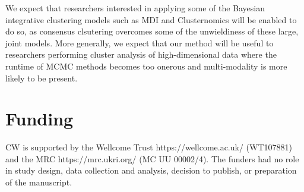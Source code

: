 \documentclass{bioinfo}
\begin{document}
We expect that researchers interested in applying some of the Bayesian integrative clustering models such as MDI and Clusternomics \citep{gabasova2017clusternomics} will be enabled to do so, as consensus clsutering overcomes some of the unwieldiness of these large, joint models. More generally, we expect that our method will be useful to researchers performing cluster analysis of high-dimensional data where the runtime of MCMC methods becomes too onerous and multi-modality is more likely to be present.






%
%






%
%
%
%
%
%
%

\section*{Funding}
CW is supported by the Wellcome Trust https://wellcome.ac.uk/ (WT107881) and the MRC https://mrc.ukri.org/ (MC UU 00002/4). The funders had no role in study design, data collection and analysis, decision to publish, or preparation of the manuscript.
\end{document}
